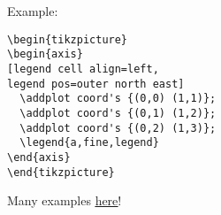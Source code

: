 Example: \\
\begin{minipage}{6.5cm}
\begin{lstlisting}
\begin{tikzpicture}
\begin{axis}
[legend cell align=left,
legend pos=outer north east]
  \addplot coord's {(0,0) (1,1)};
  \addplot coord's {(0,1) (1,2)};
  \addplot coord's {(0,2) (1,3)};
  \legend{a,fine,legend}
\end{axis}
\end{tikzpicture}
\end{lstlisting}
\end{minipage}

Many examples \href{http://pgfplots.sourceforge.net/gallery.html}{\underline{here}}!
 \ \\